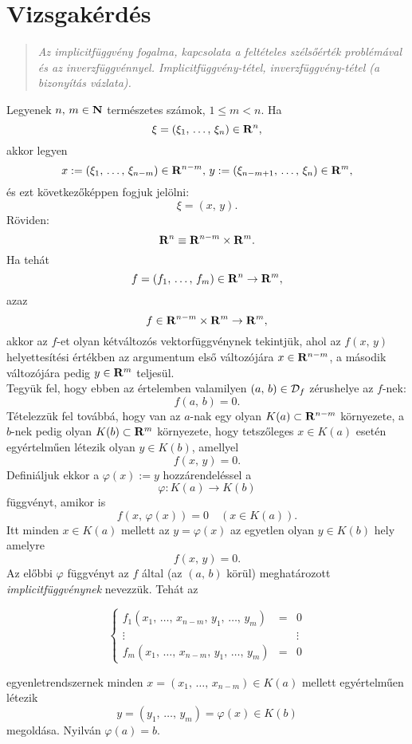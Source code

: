 \newpage
\section{Vizsgakérdés}
\begin{quote}
	\textit{Az implicitfüggvény fogalma, kapcsolata a feltételes szélsőérték problémával és az inverzfüggvénnyel. Implicitfüggvény-tétel, inverzfüggvény-tétel (a bizonyítás vázlata).}
\end{quote}

Legyenek $n, \, m \in \mathbf{N}$ természetes számok, $1 \leq m < n$. Ha
\[
	\xi = (\xi_1, \, \dots, \, \xi_n) \in \mathbf{R}^n,
\]
akkor legyen
\[
	x := (\xi_1, \, \dots, \, \xi_{n-m}) \in \mathbf{R}^{n-m}, \, y := (\xi_{n-m+1}, \, \dots, \, \xi_n) \in \mathbf{R}^m,
\]
és ezt következőképpen fogjuk jelölni:
\[
	\xi = (x, \, y).
\]
Röviden:
\[
	\mathbf{R}^n \equiv \mathbf{R}^{n-m} \times \mathbf{R}^{m}.
\]
Ha tehát
\[
	f = (f_1, \, \dots, \, f_m) \in \mathbf{R}^n \to \mathbf{R}^m,
\]
azaz
\[
	f \in \mathbf{R}^{n-m} \times \mathbf{R}^m \to \mathbf{R}^m,
\]
akkor az $f$-et olyan kétváltozós vektorfüggvénynek tekintjük, ahol az $f(x, \, y)$ helyettesítési értékben az argumentum első változójára $x \in \mathbf{R}^{n-m}$, a második változójára pedig $y \in \mathbf{R}^m$ teljesül.\\

Tegyük fel, hogy ebben az értelemben valamilyen $(a, \, b) \in \mathcal{D}_f$ zérushelye az $f$-nek:
\[
	f(a, \, b) = 0.
\]
Tételezzük fel továbbá, hogy van az $a$-nak egy olyan $K(a) \subset \mathbf{R}^{n-m}$ környezete, a $b$-nek pedig olyan $K(b) \subset \mathbf{R}^m$ környezete, hogy tetszőleges $x \in K(a)$ esetén egyértelműen létezik olyan $y \in K(b)$, amellyel
\[
	f(x, \, y) = 0.
\]
Definiáljuk ekkor a $\varphi(x) := y$ hozzárendeléssel a
\[
	\varphi : K(a) \to K(b)
\]
függvényt, amikor is
\[
	f(x, \, \varphi(x)) = 0 \quad (x \in K(a)).
\]
Itt minden $x \in K(a)$ mellett az $y = \varphi(x)$ az egyetlen olyan $y \in K(b)$ hely amelyre
\[
	f(x, \, y) = 0.
\]
Az előbbi $\varphi$ függvényt az $f$ által (az $(a, \, b)$ körül) meghatározott \textit{implicitfüggvénynek} nevezzük. Tehát az

\[
	\left\{
	\begin{array}{ccc}
		f_1(x_1, \, \dots, \, x_{n-m}, \, y_1, \, \dots, \, y_m) & = & 0 \\
		\vdots & & \vdots \\
		f_m(x_1, \, \dots, \, x_{n-m}, \, y_1, \, \dots, \, y_m) & = & 0
	\end{array}
	\right.
\]

egyenletrendszernek minden $x = (x_1, \, \dots, \, x_{n-m}) \in K(a)$ mellett egyértelműen létezik
\[
	y = (y_1, \, \dots, \, y_m) = \varphi(x) \in K(b)
\]
megoldása. Nyilván $\varphi(a) = b$.\\

